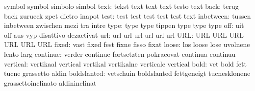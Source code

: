                            symbol                    symbol
                           simbolo                   simbol
                     text: tekst                     text
                           text                      text
                           testo                     text
                     back: terug                     back
                           zurueck                   zpet
                           dietro                    inapot
                     test: test                      test
                           test                      test
                           test                      text
                inbetween: tussen                    inbetween
                           zwischen                  mezi
                           tra                       intre
                     type: type                      type
                           tippen                    type
                           type                      type %
                      off: uit                       off
                           aus                       vyp
                           disattivo                 dezactivat
                      url: url                       url
                           url                       url
                           url                       url
                      URL: URL                       URL
                           URL                       URL
                           URL                       URL
                    fixed: vast                      fixed
                           fest                      fixne
                           fisso                     fixat
                    loose: los                       loose
                           lose                      uvolnene
                           lento                     larg
                 continue: verder                    continue
                           fortsetzten               pokracovat
                           continua                  continuu
                 vertical: vertikaal                 vertical
                           vertikal                  vertikalne
                           verticale                 vertical
                     bold: vet                       bold
                           fett                      tucne
                           grassetto                 aldin
              boldslanted: vetschuin                 boldslanted
                           fettgeneigt               tucnesklonene
                           grassettoinclinato        aldininclinat
